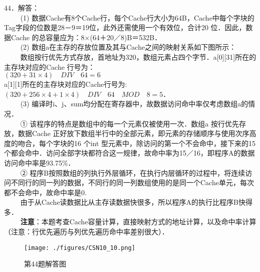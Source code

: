 44．解答：\\
$\qquad$ (1) 数据Cache有8个Cache行，每个Cache行大小为64B，Cache中每个字块的Tag字段的位数是28－9＝19位，此外还需使用一个有效位，合计20 位．因此，数据Cache 的总容量应为：8×(64＋20／8)B＝532B．\\
$\qquad$ (2) 数组a在主存的存放位置及其与Cache之间的映射关系如下图所示：\\
$\qquad$ 数组按行优先方式存放，首地址为320，数组元素占四个字节．a[0][31]所在的主存块对应的Cache 行号为：\\
$(320 + 31 \times 4) \quad DIV \quad 64 = 6$ \\
a[1][1]所在的主存块对应的Cache行号为: \\
$(320 + 256 \times 4 + 1 \times 4) \quad DIV \quad 64 \quad MOD \quad 8 = 5 $． \\
$\qquad$ (3) 编译时i、j、sum均分配在寄存器中，故数据访问命中率仅考虑数组a的情况． \\
$\qquad$ ① 该程序的特点是数组中的每一个元素仅被使用一次．数组a 按行优先存放，数据Cache 正好放下数组半行中的全部元素，即元素的存储顺序与使用次序高度的吻合，每个字块的16 个int 型元素中，除访问的第一个不会命中，接下来的15 个都会命中．访问全部字块都符合这一规律，故命中率为15／16，即程序A的数据访问命中率是93.75\%． \\
$\qquad$ ② 程序B按照数组的列执行外层循环，在执行内层循环的过程中，将连续访问不同行的同一列的数据，不同行的同一列数组使用的是同一个Cache单元，每次都不会命中，故命中率是0. \\
$\qquad$ 由于从Cache读数据比从主存读数据快很多，所以程序A的执行比程序B快得多．\\
$\qquad$ \textbf{注意}：本题考查Cache容量计算，直接映射方式的地址计算，以及命中率计算（注意：行优先遍历与列优先遍历命中率差别很大）．
\begin{figure}[ht]
\centering
\texttt{[image: ./figures/CSN10\_10.png]}
\caption{第44题解答图} \label{CSN10_fig10}
\end{figure}

